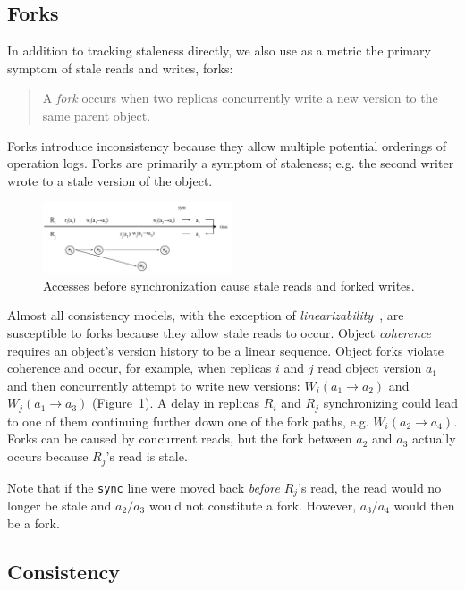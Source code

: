 \documentclass[10pt,conference,letterpaper]{IEEEtran}
\begin{document}
\subsection{Forks}

In addition to tracking staleness directly, we also use as a metric the primary symptom of stale
reads and writes, forks:
\begin{quote}
    A \emph{fork} occurs when two replicas concurrently write a new version to the same parent object.
\end{quote}
Forks introduce inconsistency because they allow multiple potential orderings of operation
logs.
Forks are primarily a symptom of staleness; e.g. the second writer wrote to
a stale version of the object.

\begin{figure}[t]
    \centering
    \includegraphics[width=0.5\textwidth]{figures/forks}
    \caption{Accesses before synchronization cause stale reads and forked writes.}
    \label{fig:forks}
\end{figure}

Almost all consistency models, with the exception of
\textit{linearizability}~\cite{herlihy_linearizability:_1990}, are susceptible to forks
because they allow stale reads to occur.
Object \emph{coherence} requires an object's version history to be a linear sequence.
Object forks violate coherence and occur, for example, when replicas $i$ and $j$ read object version $a_1$
and then concurrently attempt to write new versions: $W_i(a_1 \rightarrow a_2)$ and
$W_j(a_1 \rightarrow a_3)$ (Figure~\ref{fig:forks}).
A delay in replicas $R_i$ and $R_j$ synchronizing could lead to one of them continuing
further down one of the fork paths, e.g. $W_i(a_2 \rightarrow a_4)$.
Forks can be caused by concurrent reads, but the fork between $a_2$ and $a_3$
actually occurs because $R_j$'s read is stale.

Note that if the \texttt{sync} line were moved back \emph{before} $R_j$'s read,
the read would no longer be stale and $a_2/a_3$ would not constitute a
fork. However,  $a_3/a_4$ would then be a fork.

\subsection{Consistency}
\end{document}
